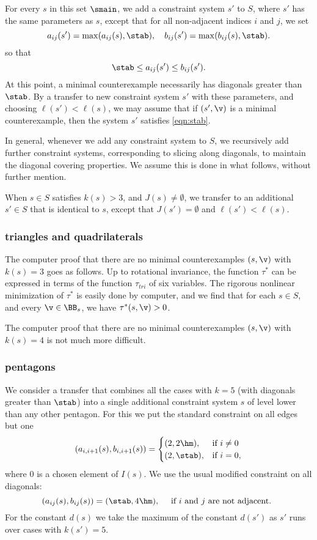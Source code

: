 For every $s$ in this set $\smain$, we add a constraint system $s'$ to $S$,
where $s'$ has the same parameters as $s$, except that for all
non-adjacent indices $i$ and $j$, we set
\begin{equation}\label{eqn:s'}
a_{ij}(s') = \max(a_{ij}(s),\stab),\quad b_{ij}(s')=\max(b_{ij}(s),\stab).
\end{equation}
so that
\begin{equation}\label{eqn:stab}
\stab \le a_{ij}(s')\le b_{ij}(s').
\end{equation}
At this point, a minimal counterexample necessarily has diagonals
greater than $\stab$.  By a transfer to new constraint system $s'$ with
these parameters, and choosing $\ell(s')<\ell(s)$, we may
assume that if $(s',\v)$ is a minimal counterexample, then the system
$s'$ satisfies \eqref{eqn:stab}.

In general, whenever we add any constraint system to $S$, we recursively add
further constraint systems, corresponding to slicing along diagonals,
to maintain the diagonal covering properties.  We assume this is done
in what follows, without further mention.

When $s\in S$ satisfies $k(s)>3$, and $J(s)\ne\emptyset$, we transfer
to an additional $s'\in S$ that is identical to $s$, except that $J(s')=\emptyset$
and $\ell(s')<\ell(s)$.  



\subsubsection{triangles and quadrilaterals}

The computer proof that there are no minimal counterexamples $(s,\v)$
with $k(s)=3$ goes as follows.  Up to rotational invariance, the function
$\tau^*$ can be expressed in terms of the function $\tau_{tri}$ of six
variables.  The rigorous nonlinear minimization of $\tau^*$ is easily done
by computer, and we find that for each $s\in S$, and every $\v\in \BB_s$,
we have $\tau^*(s,\v)>0$.

The computer proof that there are no minimal counterexamples $(s,\v)$
with $k(s)=4$ is not much more difficult.

\subsubsection{pentagons}

We consider a transfer that combines all the cases with $k=5$ (with
diagonals greater than $\stab$) into a single additional constraint
system $s$ of level lower than any other pentagon.  For this we put
the standard constraint on all edges but one
\[
(a_{i,i+1}(s),b_{i,i+1}(s))=
\begin{cases}
(2,2\hm),&\text{if } i\ne 0\\
(2,\stab),&\text{if } i=0,
\end{cases}
\]
where $0$ is a chosen element of $I(s)$.
We use the usual modified constraint on all diagonals:
\[
(a_{ij}(s),b_{ij}(s))=(\stab,4\hm),\quad \text{ if $i$ and $j$ are not adjacent. }
\]
For the constant $d(s)$ we take  the maximum of
the constant $d(s')$ as $s'$ runs over cases with $k(s')=5$.

